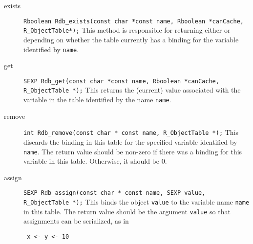 \documentclass{article}
\begin{document}
\begin{description}
\item[exists] {\small 
\verb+Rboolean Rdb_exists(const char *const name, Rboolean *canCache, R_ObjectTable*);+ 
} This method is
  responsible for returning either \STrue{} or \SFalse{} depending on
  whether the table currently has a binding for the variable
  identified by \verb+name+.
\item[get] {\small
\verb+SEXP Rdb_get(const char *const name, Rboolean *canCache, R_ObjectTable *);+ 
} This returns the (current) value
  associated with the variable in the table identified by the name
  \verb+name+.
\item[remove] {\small
\verb+int Rdb_remove(const char * const name, R_ObjectTable *);+
}
 This discards the binding in this table for
  the specified variable identified by \verb+name+.  The return value
  should be non-zero if there was a binding for this variable in this
  table. Otherwise, it should be $0$.
\item[assign] {\small 
\verb+SEXP Rdb_assign(const char * const name, SEXP value, R_ObjectTable *);+ 
} This binds the object
  \verb+value+ to the variable name \verb+name+ in this table.  The
  return value should be the argument \verb+value+ so that assignments
  can be serialized, as in
\begin{verbatim}
 x <- y <- 10
\end{verbatim}


\end{description}
\end{document}
